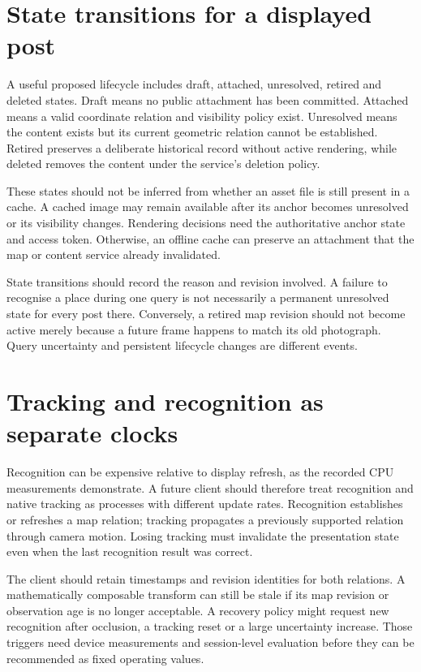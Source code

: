 \section{State transitions for a displayed post}
A useful proposed lifecycle includes draft, attached, unresolved, retired and deleted states. Draft means no public attachment has been committed. Attached means a valid coordinate relation and visibility policy exist. Unresolved means the content exists but its current geometric relation cannot be established. Retired preserves a deliberate historical record without active rendering, while deleted removes the content under the service's deletion policy.

These states should not be inferred from whether an asset file is still present in a cache. A cached image may remain available after its anchor becomes unresolved or its visibility changes. Rendering decisions need the authoritative anchor state and access token. Otherwise, an offline cache can preserve an attachment that the map or content service already invalidated.

State transitions should record the reason and revision involved. A failure to recognise a place during one query is not necessarily a permanent unresolved state for every post there. Conversely, a retired map revision should not become active merely because a future frame happens to match its old photograph. Query uncertainty and persistent lifecycle changes are different events.

\section{Tracking and recognition as separate clocks}
Recognition can be expensive relative to display refresh, as the recorded CPU measurements demonstrate. A future client should therefore treat recognition and native tracking as processes with different update rates. Recognition establishes or refreshes a map relation; tracking propagates a previously supported relation through camera motion. Losing tracking must invalidate the presentation state even when the last recognition result was correct.

The client should retain timestamps and revision identities for both relations. A mathematically composable transform can still be stale if its map revision or observation age is no longer acceptable. A recovery policy might request new recognition after occlusion, a tracking reset or a large uncertainty increase. Those triggers need device measurements and session-level evaluation before they can be recommended as fixed operating values.

